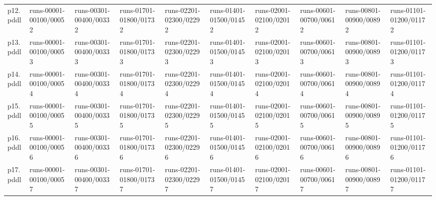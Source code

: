 \documentclass{article}
\begin{document}
\begin{tabular}{@{}lrrrrrrrrr@{}}
p12.pddl & \multicolumn{1}{|l|}{runs-00001-00100/00052} & \multicolumn{1}{|l|}{runs-00301-00400/00332} & \multicolumn{1}{|l|}{runs-01701-01800/01732} & \multicolumn{1}{|l|}{runs-02201-02300/02292} & \multicolumn{1}{|l|}{runs-01401-01500/01452} & \multicolumn{1}{|l|}{runs-02001-02100/02012} & \multicolumn{1}{|l|}{runs-00601-00700/00612} & \multicolumn{1}{|l|}{runs-00801-00900/00892} & \multicolumn{1}{|l|}{runs-01101-01200/01172} \\
p13.pddl & \multicolumn{1}{|l|}{runs-00001-00100/00053} & \multicolumn{1}{|l|}{runs-00301-00400/00333} & \multicolumn{1}{|l|}{runs-01701-01800/01733} & \multicolumn{1}{|l|}{runs-02201-02300/02293} & \multicolumn{1}{|l|}{runs-01401-01500/01453} & \multicolumn{1}{|l|}{runs-02001-02100/02013} & \multicolumn{1}{|l|}{runs-00601-00700/00613} & \multicolumn{1}{|l|}{runs-00801-00900/00893} & \multicolumn{1}{|l|}{runs-01101-01200/01173} \\
p14.pddl & \multicolumn{1}{|l|}{runs-00001-00100/00054} & \multicolumn{1}{|l|}{runs-00301-00400/00334} & \multicolumn{1}{|l|}{runs-01701-01800/01734} & \multicolumn{1}{|l|}{runs-02201-02300/02294} & \multicolumn{1}{|l|}{runs-01401-01500/01454} & \multicolumn{1}{|l|}{runs-02001-02100/02014} & \multicolumn{1}{|l|}{runs-00601-00700/00614} & \multicolumn{1}{|l|}{runs-00801-00900/00894} & \multicolumn{1}{|l|}{runs-01101-01200/01174} \\
p15.pddl & \multicolumn{1}{|l|}{runs-00001-00100/00055} & \multicolumn{1}{|l|}{runs-00301-00400/00335} & \multicolumn{1}{|l|}{runs-01701-01800/01735} & \multicolumn{1}{|l|}{runs-02201-02300/02295} & \multicolumn{1}{|l|}{runs-01401-01500/01455} & \multicolumn{1}{|l|}{runs-02001-02100/02015} & \multicolumn{1}{|l|}{runs-00601-00700/00615} & \multicolumn{1}{|l|}{runs-00801-00900/00895} & \multicolumn{1}{|l|}{runs-01101-01200/01175} \\
p16.pddl & \multicolumn{1}{|l|}{runs-00001-00100/00056} & \multicolumn{1}{|l|}{runs-00301-00400/00336} & \multicolumn{1}{|l|}{runs-01701-01800/01736} & \multicolumn{1}{|l|}{runs-02201-02300/02296} & \multicolumn{1}{|l|}{runs-01401-01500/01456} & \multicolumn{1}{|l|}{runs-02001-02100/02016} & \multicolumn{1}{|l|}{runs-00601-00700/00616} & \multicolumn{1}{|l|}{runs-00801-00900/00896} & \multicolumn{1}{|l|}{runs-01101-01200/01176} \\
p17.pddl & \multicolumn{1}{|l|}{runs-00001-00100/00057} & \multicolumn{1}{|l|}{runs-00301-00400/00337} & \multicolumn{1}{|l|}{runs-01701-01800/01737} & \multicolumn{1}{|l|}{runs-02201-02300/02297} & \multicolumn{1}{|l|}{runs-01401-01500/01457} & \multicolumn{1}{|l|}{runs-02001-02100/02017} & \multicolumn{1}{|l|}{runs-00601-00700/00617} & \multicolumn{1}{|l|}{runs-00801-00900/00897} & \multicolumn{1}{|l|}{runs-01101-01200/01177} \\

\end{tabular}
\end{document}
